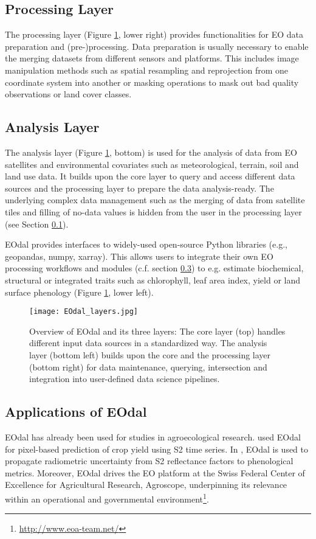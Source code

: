 \subsection{Processing Layer}
\label{subsec:processing-layer}
The processing layer (Figure \ref{fig:overview}, lower right) provides functionalities for \gls{EO} data preparation and (pre-)processing. Data preparation is usually necessary to enable the merging datasets from different sensors and platforms. This includes image manipulation methods such as spatial resampling and reprojection from one coordinate system into another or masking operations to mask out bad quality observations or land cover classes.

\subsection{Analysis Layer}
The analysis layer (Figure \ref{fig:overview}, bottom) is used for the analysis of data from \gls{EO} satellites and environmental covariates such as meteorological, terrain, soil and land use data. It builds upon the core layer to query and access different data sources and the processing layer to prepare the data analysis-ready. The underlying complex data management such as the merging of data from satellite tiles and filling of no-data values is hidden from the user in the processing layer (see Section \ref{subsec:processing-layer}).

\gls{EOdal} provides interfaces to widely-used open-source Python libraries (e.g., geopandas, numpy, xarray). This allows users to integrate their own \gls{EO} processing workflows and modules (c.f. section \ref{subsec:supplementary-modules}) to e.g. estimate biochemical, structural or integrated traits such as chlorophyll, leaf area index, yield or land surface phenology (Figure \ref{fig:overview}, lower left).

\begin{figure}[H]
    \centering
    \texttt{[image: EOdal\_layers.jpg]}
    \caption{Overview of EOdal and its three layers: The core layer (top) handles different input data sources in a standardized way. The analysis layer (bottom left) builds upon the core and the processing layer (bottom right) for data maintenance, querying, intersection and integration into user-defined data science pipelines.}
    \label{fig:overview}
\end{figure}

\subsection{Applications of EOdal}
\label{subsec:supplementary-modules}
\gls{EOdal} has already been used for studies in agroecological research. \citet{perich_pixel-based_2023} used \gls{EOdal} for pixel-based prediction of crop yield using S2 time series.  In \citet{graf_propagating_2022}, \gls{EOdal} is used to propagate radiometric uncertainty from \gls{S2} reflectance factors to phenological metrics. Moreover, \gls{EOdal} drives the \gls{EO} platform at the Swiss Federal Center of Excellence for Agricultural Research, Agroscope, underpinning its relevance within an operational and governmental environment\footnote{\url{http://www.eoa-team.net/}}.

